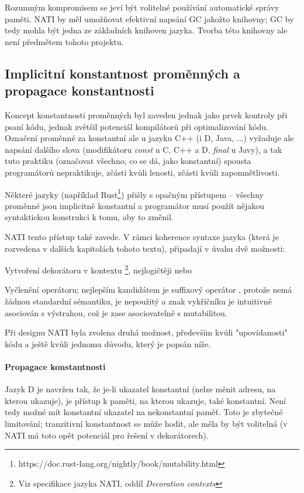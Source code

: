 Rozumným kompromisem se jeví být volitelné používání automatické správy paměti. NATI by měl umožňovat efektivní napsání GC jakožto knihovny; GC by tedy mohla být jedna ze základních knihoven jazyka. Tvorba této knihovny ale není předmětem tohoto projektu.

\subsection{Implicitní konstantnost proměnných a propagace konstantnosti}
Koncept konstantnosti proměnných byl zaveden jednak jako prvek kontroly při psaní kódu, jednak zvětšil potenciál kompilátorů při optimalizování kódu. Označení proměnné za konstantní ale u jazyku C++ (i D, Java, ...) vyžaduje ale napsání dalšího slova (modifikátoru \textit{const} u C, C++ a D, \textit{final} u Javy), a tak tuto praktiku (označovat všechno, co se dá, jako konstantní) spousta programátorů nepraktikuje, zčásti kvůli lenosti, zčásti kvůli zapomnětlivosti.

Některé jazyky (například Rust\footnote{https://doc.rust-lang.org/nightly/book/mutability.html}) přišly s opačným přístupem -- všechny proměnné jsou implicitně konstantní a programátor musí použít nějakou syntaktickou konstrukci k tomu, aby to změnil.

NATI tento přístup také zavede. V rámci koherence syntaxe jazyka (která je rozvedena v dalších kapitolách tohoto textu), připadají v úvahu dvě možnosti:
\begin{compactenum}
	\item Vytvoření dekorátoru v kontextu \footnote{Viz specifikace jazyka NATI, oddíl \textit{Decoration contexts}}, nejlogičtěji  nebo 
	\item Vyčlenění operátoru; nejlepším kandidátem je suffixový operátor , protože nemá žádnou standardní sémantiku, je nepoužitý a znak vykřičníku je intuitivně asociován s výstrahou, což je zase asociovatelné s mutabilitou.
\end{compactenum}

Při designu NATI byla zvolena druhá možnost, především kvůli "upovídanosti" kódu a ještě kvůli jednomu důvodu, který je popsán níže.

\paragraph{Propagace konstantnosti} Jazyk D je navržen tak, že je-li ukazatel konstantní (nelze měnit adresu, na kterou ukazuje), je přístup k paměti, na kterou ukazuje, také konstantní. Není tedy možné mít konstantní ukazatel na nekonstantní paměť. Toto je zbytečné limitování; tranzitivní konstantnost se může hodit, ale měla by být volitelná (v NATI má toto opět potenciál pro řešení v dekorátorech).

